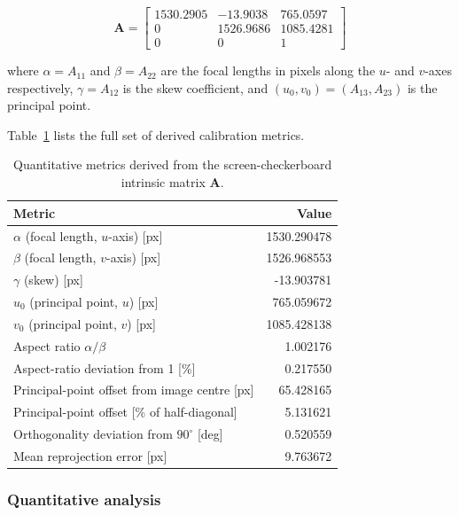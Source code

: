 \documentclass[11pt,a4paper]{article}
\begin{document}
\begin{equation}
\mathbf{A} =
\begin{bmatrix}
1530.2905 & -13.9038 & 765.0597 \\
0         & 1526.9686 & 1085.4281 \\
0         & 0          & 1
\end{bmatrix}
\label{eq:A_screen}
\end{equation}

\noindent where $\alpha = A_{11}$ and $\beta = A_{22}$ are the focal lengths
in pixels along the $u$- and $v$-axes respectively, $\gamma = A_{12}$ is the
skew coefficient, and $(u_0, v_0) = (A_{13}, A_{23})$ is the principal point.

Table~\ref{tab:screen_metrics} lists the full set of derived calibration metrics.

\begin{table}[htbp]
\centering
\caption{Quantitative metrics derived from the screen-checkerboard intrinsic matrix
         $\mathbf{A}$.}
\label{tab:screen_metrics}
\begin{tabular}{lr}
\hline
Metric & {Value} \\
\hline
$\alpha$ (focal length, $u$-axis) [px]     & 1530.290478 \\
$\beta$ (focal length, $v$-axis) [px]      & 1526.968553 \\
$\gamma$ (skew) [px]                       & -13.903781  \\
$u_0$ (principal point, $u$) [px]          & 765.059672  \\
$v_0$ (principal point, $v$) [px]          & 1085.428138 \\
Aspect ratio $\alpha/\beta$                & 1.002176    \\
Aspect-ratio deviation from 1 [\%]        & 0.217550    \\
Principal-point offset from image centre [px] & 65.428165 \\
Principal-point offset [\% of half-diagonal]  & 5.131621  \\
Orthogonality deviation from $90^\circ$ [deg] & 0.520559  \\
Mean reprojection error [px]               & 9.763672    \\
\hline
\end{tabular}
\end{table}

\subsubsection*{Quantitative analysis}
\end{document}
